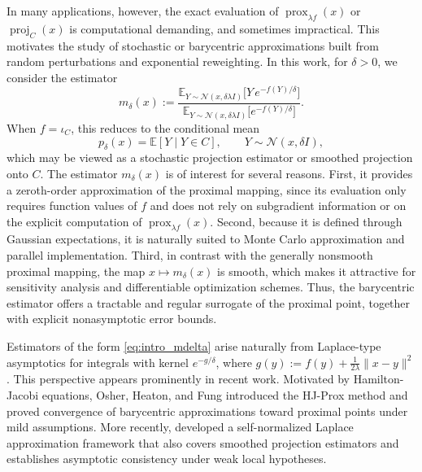 \documentclass[11pt]{article}
\newcommand{\1}{\mathds{1}}
\theoremstyle{definition}
\theoremstyle{remark}
\theoremstyle{definition}
\newcommand{\E}{\mathbb{E}}
\newcommand{\proj}{\operatorname{proj}}
\begin{document}
In many applications, however, the exact evaluation of 
\(\operatorname{prox}_{\lambda f}(x)\) or \(\proj_C(x)\) is computational demanding, and sometimes impractical. This motivates the study of stochastic or barycentric
approximations built from random perturbations and exponential
reweighting. In this work, for \(\delta>0\), we consider the estimator
\begin{equation}\label{eq:intro_mdelta}
m_\delta(x)
:=
\frac{\E_{Y\sim\mathcal{N}(x,\delta\lambda I)}
\!\big[Y\,e^{-f(Y)/\delta}\big]}
{\E_{Y\sim\mathcal{N}(x,\delta\lambda I)}
\!\big[e^{-f(Y)/\delta}\big]}.
\end{equation}
When \(f=\iota_C\), this reduces to the conditional mean
\[
p_\delta(x)=\E[Y\mid Y\in C],\qquad Y\sim \mathcal N(x,\delta I),
\]
which may be viewed as a stochastic projection estimator or smoothed
projection onto \(C\). The estimator \(m_\delta(x)\) is of interest for several reasons. First, it provides a zeroth-order approximation of the proximal mapping, since its evaluation only requires function values of \(f\) and does not rely on subgradient information or on the explicit computation of \(\operatorname{prox}_{\lambda f}(x)\). Second, because it is defined through Gaussian expectations, it is naturally suited to Monte Carlo approximation and parallel implementation. Third, in contrast with the generally nonsmooth proximal mapping, the map \(x\mapsto m_\delta(x)\) is smooth, which makes it attractive for sensitivity analysis and differentiable optimization schemes. Thus, the barycentric estimator offers a tractable and regular surrogate of the proximal point, together with explicit nonasymptotic error bounds.

Estimators of the form \eqref{eq:intro_mdelta} arise naturally from
Laplace-type asymptotics for integrals with kernel \(e^{-g/\delta}\), where
\(g(y):=f(y)+\frac{1}{2\lambda}\|x-y\|^2\). This perspective appears
prominently in recent work. Motivated by Hamilton-Jacobi equations,
Osher, Heaton, and Fung \cite{MR4581306} introduced the HJ-Prox method and
proved convergence of barycentric approximations toward proximal points
under mild assumptions. More recently, \cite{MR4923371} developed a
self-normalized Laplace approximation framework that also covers smoothed
projection estimators and establishes asymptotic consistency under weak
local hypotheses.
\end{document}
